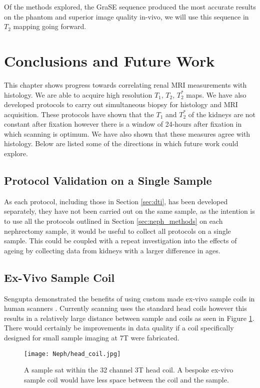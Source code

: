 Of the methods explored, the \ac{GraSE} sequence produced the most accurate results on the phantom and superior image quality in-vivo, we will use this sequence in $T_2$ mapping going forward.

\section{Conclusions and Future Work}

This chapter shows progress towards correlating renal \ac{MRI} measurements with histology. We are able to acquire high resolution $T_1$, $T_2$, $T_2^*$ maps. We have also developed protocols to carry out simultaneous biopsy for histology and \ac{MRI} acquisition. These protocols have shown that the $T_1$ and $T_2^*$ of the kidneys are not constant after fixation however there is a window of 24-hours after fixation in which scanning is optimum. We have also shown that these measures agree with histology. Below are listed some of the directions in which future work could explore.\\

\subsection{Protocol Validation on a Single Sample}

As each protocol, including those in Section \ref{sec:dti}, has been developed separately, they have not been carried out on the same sample, as the intention is to use all the protocols outlined in Section \ref{sec:neph_methods} on each nephrectomy sample, it would be useful to collect all protocols on a single sample. This could be coupled with a repeat investigation into the effects of ageing by collecting data from kidneys with a larger difference in ages.

\subsection{Ex-Vivo Sample Coil}
Sengupta demonstrated the benefits of using custom made ex-vivo sample coils in human scanners \cite{sengupta_high_2017}. Currently scanning uses the standard head coils however this results in a relatively large distance between sample and coils as seen in Figure \ref{fig:head_coil}. There would certainly be improvements in data quality if a coil specifically designed for small sample imaging at 7T were fabricated.
\begin{figure}[H]
	\centering
	\texttt{[image: Neph/head\_coil.jpg]}
	\caption{A sample sat within the 32 channel 3T head coil. A bespoke ex-vivo sample coil would have less space between the coil and the sample.}
	\label{fig:head_coil}	
\end{figure}

